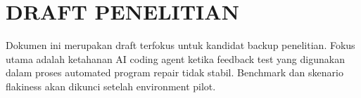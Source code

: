 \documentclass[proposal,satusetengahspasi,indonesia]{../cls/template-ta-2025}
\begin{document}
\titlepageind

\chapter*{DRAFT PENELITIAN}

Dokumen ini merupakan draft terfokus untuk kandidat backup penelitian. Fokus utama adalah ketahanan AI coding agent ketika feedback test yang digunakan dalam proses automated program repair tidak stabil. Benchmark dan skenario flakiness akan dikunci setelah environment pilot.

\tableofcontents
\clearpage
{}



\end{document}

